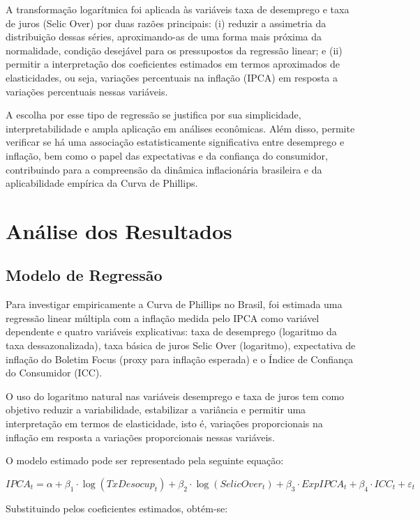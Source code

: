 \documentclass[12pt,oneside]{abntex2}
\begin{document}
A transformação logarítmica foi aplicada às variáveis taxa de desemprego e taxa de juros (Selic Over) por duas razões principais:  
(i) reduzir a assimetria da distribuição dessas séries, aproximando-as de uma forma mais próxima da normalidade, condição desejável para os pressupostos da regressão linear; e  
(ii) permitir a interpretação dos coeficientes estimados em termos aproximados de elasticidades, ou seja, variações percentuais na inflação (IPCA) em resposta a variações percentuais nessas variáveis.

A escolha por esse tipo de regressão se justifica por sua simplicidade, interpretabilidade e ampla aplicação em análises econômicas. Além disso, permite verificar se há uma associação estatisticamente significativa entre desemprego e inflação, bem como o papel das expectativas e da confiança do consumidor, contribuindo para a compreensão da dinâmica inflacionária brasileira e da aplicabilidade empírica da Curva de Phillips.

\section{\textbf{Análise dos Resultados}}

\subsection{\textbf{Modelo de Regressão}}

Para investigar empiricamente a Curva de Phillips no Brasil, foi estimada uma regressão linear múltipla com a inflação medida pelo IPCA como variável dependente e quatro variáveis explicativas: taxa de desemprego (logaritmo da taxa dessazonalizada), taxa básica de juros Selic Over (logaritmo), expectativa de inflação do Boletim Focus (proxy para inflação esperada) e o Índice de Confiança do Consumidor (ICC). 

O uso do logaritmo natural nas variáveis desemprego e taxa de juros tem como objetivo reduzir a variabilidade, estabilizar a variância e permitir uma interpretação em termos de elasticidade, isto é, variações proporcionais na inflação em resposta a variações proporcionais nessas variáveis. 

O modelo estimado pode ser representado pela seguinte equação:

\[
IPCA_t = \alpha + \beta_1 \cdot \log(TxDesocup_t) + \beta_2 \cdot \log(SelicOver_t) + \beta_3 \cdot ExpIPCA_t + \beta_4 \cdot ICC_t + \varepsilon_t
\]

Substituindo pelos coeficientes estimados, obtém-se:
\end{document}
